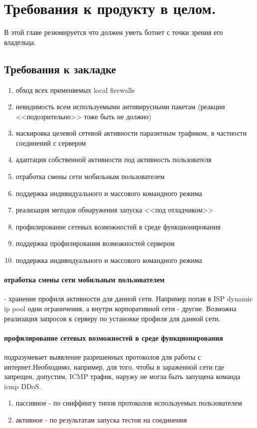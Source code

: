 \section{Требования к продукту в целом.}

В этой главе резюмируется что должен уметь ботнет с точки зрения его владельца.

\subsection{Требования к закладке}
\begin{enumerate}
\item{обход всех применяемых local firewalls}
\item{невидимость всем используемыми антивирусными пакетам (реакции <<подозрительно>> тоже быть не должно)}
\item{маскировка целевой сетевой активности паразитным трафиком, в частности соединений с сервером}
\item{адаптация собственной активности под активность пользователя}
\item{отработка смены сети мобильным пользователем}
\item{поддержка индивидуального и массового командного режима}
\item{реализация методов обнаружения запуска <<под отладчиком>>}
\item{профилирование сетевых возможностей в среде функционирования}
\item{поддержка профилирования возможностей сервером}
\item{поддержка индивидуального и массового командного режима}
\end{enumerate}

\paragraph{отработка смены сети мобильным пользователем} - хранение профиля активности для данной сети. Например попав в ISP dynamic ip pool одни ограничения, а внутри корпоративной сети - другие. Возможна реализация запросов
к серверу по установке профиля для данной сети.

\paragraph{профилирование сетевых возможностей в среде функционирования} подразумевает выявление
разрешенных протоколов для работы с интернет.Необходимо, например, для того, чтобы в зараженной сети где запрещен, допустим, ICMP трафик, наружу не могла быть запущена команда icmp DDoS.
\begin{enumerate}
\item{пассивное - по сниффингу типов протоколов используемых пользователем}
\item{активное - по результатам запуска тестов на соединения}
\end{enumerate}

